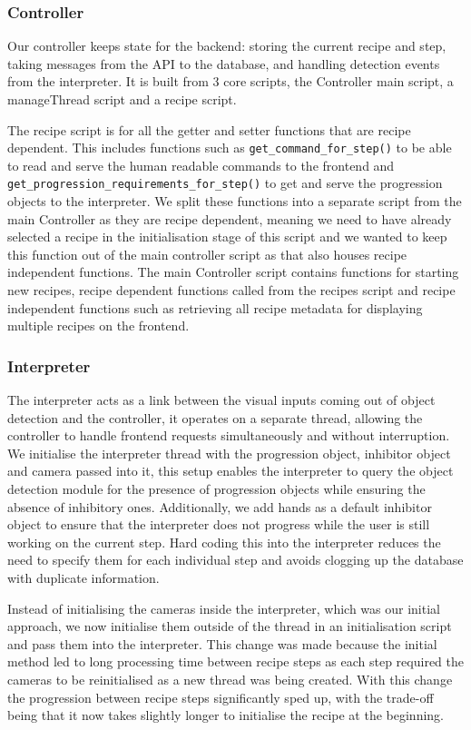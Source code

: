 \documentclass{article}
\begin{document}
    \subsubsection{Controller}
    Our controller keeps state for the backend: storing the current recipe and step, taking messages from the API to the database, and handling detection events from the interpreter. It is built from 3 core scripts, the Controller main script, a manageThread script and a recipe script. 
    
    The recipe script is for all the getter and setter functions that are recipe dependent. This includes functions such as \verb|get_command_for_step()| to be able to read and serve the human readable commands to the frontend and \\ \verb|get_progression_requirements_for_step()| to get and serve the progression objects to the interpreter. We split these functions into a separate script from the main Controller as they are recipe dependent, meaning we need to have already selected a recipe in the initialisation stage of this script and we wanted to keep this function out of the main controller script as that also houses recipe independent functions.
    The main Controller script contains functions for starting new recipes, recipe dependent functions called from the recipes script and recipe independent functions such as retrieving all recipe metadata for displaying multiple recipes on the frontend.
    \subsubsection{Interpreter}
    The interpreter acts as a link between the visual inputs coming out of object detection and the controller, it operates on a separate thread, allowing the controller to handle frontend requests simultaneously and without interruption. We initialise the interpreter thread with the progression object, inhibitor object and camera passed into it, this setup enables the interpreter to query the object detection module for the presence of progression objects while ensuring the absence of inhibitory ones. Additionally, we add hands as a default inhibitor object to ensure that the interpreter does not progress while the user is still working on the current step. Hard coding this into the interpreter reduces the need to specify them for each individual step and avoids clogging up the database with duplicate information.
    
    Instead of initialising the cameras inside the interpreter, which was our initial approach, we now initialise them outside of the thread in an initialisation script and pass them into the interpreter. This change was made because the initial method led to long processing time between recipe steps as each step required the cameras to be reinitialised as a new thread was being created. With this change the progression between recipe steps significantly sped up, with the trade-off being that it now takes slightly longer to initialise the recipe at the beginning.
    
\end{document}
